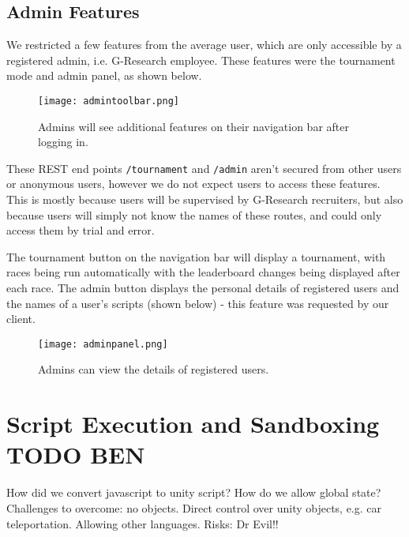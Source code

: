 \subsection{Admin Features}

We restricted a few features from the average user, which are only accessible by a registered admin, i.e. G-Research employee. These features were the tournament mode and admin panel, as shown below.

\begin{figure}[H]
\centering
\texttt{[image: admintoolbar.png]}
\caption{Admins will see additional features on their navigation bar after logging in.}
\end{figure}

These REST end points {\tt/tournament} and {\tt/admin} aren't secured from other users or anonymous users, however we do not expect users to access these features. This is mostly because users will be supervised by G-Research recruiters, but also because users will simply not know the names of these routes, and could only access them by trial and error.

The tournament button on the navigation bar will display a tournament, with races being run automatically with the leaderboard changes being displayed after each race. The admin button displays the personal details of registered users and the names of a user's scripts (shown below) - this feature was requested by our client. 
\begin{figure}[H]
\centering
\texttt{[image: adminpanel.png]}
\caption{Admins can view the details of registered users.}
\end{figure}

\section{Script Execution and Sandboxing TODO {\color{green} BEN}}
How did we convert javascript to unity script?
How do we allow global state?
Challenges to overcome: no objects. Direct control over unity objects, e.g. car teleportation. Allowing other languages.
Risks: Dr Evil!!

